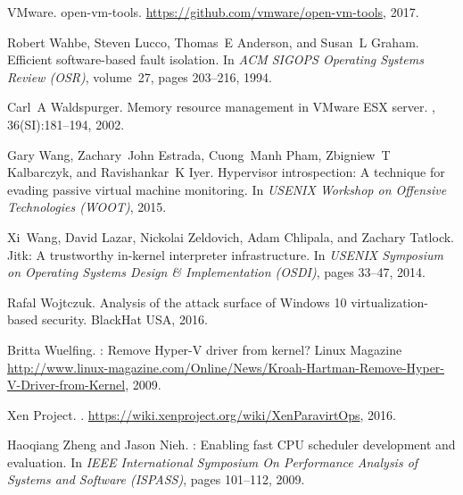 \documentclass[11pt]{article}
\begin{document}
\begin{thebibliography}{10}
\begin{small}
  VMware.
  \newblock open-vm-tools.
  \newblock \url{https://github.com/vmware/open-vm-tools}, 2017.
  
  Robert Wahbe, Steven Lucco, Thomas~E Anderson, and Susan~L Graham.
  \newblock Efficient software-based fault isolation.
  \newblock In {\em ACM SIGOPS Operating Systems Review (OSR)}, volume~27, pages
    203--216, 1994.
  
  Carl~A Waldspurger.
  \newblock Memory resource management in {VMware ESX} server.
  , 36(SI):181--194,
    2002.
  
  Gary Wang, Zachary~John Estrada, Cuong~Manh Pham, Zbigniew~T Kalbarczyk, and
    Ravishankar~K Iyer.
  \newblock Hypervisor introspection: A technique for evading passive virtual
    machine monitoring.
  \newblock In {\em USENIX Workshop on Offensive Technologies (WOOT)}, 2015.
  
  Xi~Wang, David Lazar, Nickolai Zeldovich, Adam Chlipala, and Zachary Tatlock.
  \newblock Jitk: A trustworthy in-kernel interpreter infrastructure.
  \newblock In {\em USENIX Symposium on Operating Systems Design \&
    Implementation (OSDI)}, pages 33--47, 2014.
  
  Rafal Wojtczuk.
  \newblock Analysis of the attack surface of {Windows} 10 virtualization-based
    security.
  \newblock BlackHat USA, 2016.
  
  Britta Wuelfing.
  : Remove {Hyper-V} driver from kernel?
  \newblock Linux Magazine
    \url{http://www.linux-magazine.com/Online/News/Kroah-Hartman-Remove-Hyper-V-Driver-from-Kernel},
    2009.
  
  {Xen Project}.
  .
  \newblock \url{https://wiki.xenproject.org/wiki/XenParavirtOps}, 2016.
  
  Haoqiang Zheng and Jason Nieh.
  : Enabling fast {CPU} scheduler development and evaluation.
  \newblock In {\em IEEE International Symposium On Performance Analysis of
    Systems and Software (ISPASS)}, pages 101--112, 2009.
  \end{small}
  \end{thebibliography}
\end{document}
